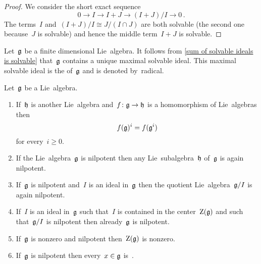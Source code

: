 \begin{proof}
  We consider the short exact sequence
  \[
    0
    \to
    I
    \to
    I+J
    \to
    (I+J)/I
    \to
    0 \,.
  \]
  The terms~$I$ and~$(I+J)/I \cong J/(I \cap J)$ are both solvable (the second one because~$J$ is solvable) and hence the middle term~$I+J$ is solvable.
\end{proof}


\begin{definition}
 Let~$\mathfrak{g}$ be a finite dimensional Lie~algebra.
 It follows from \cref{sum of solvable ideals is solvable} that~$\mathfrak{g}$ contains a unique maximal solvable ideal. This maximal solvable ideal is the  of~$\mathfrak{g}$ and is denoted by~\gls*{radical}.
\end{definition}


\begin{proposition}
  \label{properties of nilpotence}
  Let~$\mathfrak{g}$ be a Lie~algebra.
  \begin{enumerate}
    \item
      If~$\mathfrak{h}$ is another Lie~algebra and~$f \colon \mathfrak{g} \to \mathfrak{h}$ is a homomorphism of Lie~algebras then
      \[
        f(\mathfrak{g})^i
        =
        f(\mathfrak{g}^i)
      \]
      for every~$i \geq 0$.
    \item
      If the Lie~algebra~$\mathfrak{g}$ is nilpotent then any Lie~subalgebra~$\mathfrak{h}$ of~$\mathfrak{g}$ is again nilpotent.
    \item
      If~$\mathfrak{g}$ is nilpotent and~$I$ is an ideal in~$\mathfrak{g}$ then the quotient Lie~algebra~$\mathfrak{g}/I$ is again nilpotent.
    \item
      If~$I$ is an ideal in~$\mathfrak{g}$ such that~$I$ is contained in the center~$\operatorname{Z}(\mathfrak{g})$ and such that~$\mathfrak{g}/I$ is nilpotent then already~$\mathfrak{g}$ is nilpotent.
    \item
      If~$\mathfrak{g}$ is nonzero and nilpotent then~$\operatorname{Z}(\mathfrak{g})$ is nonzero.
    \item
      If~$\mathfrak{g}$ is nilpotent then every~$x \in \mathfrak{g}$ is~{\adnilpotent}.
  \end{enumerate}
\end{proposition}


